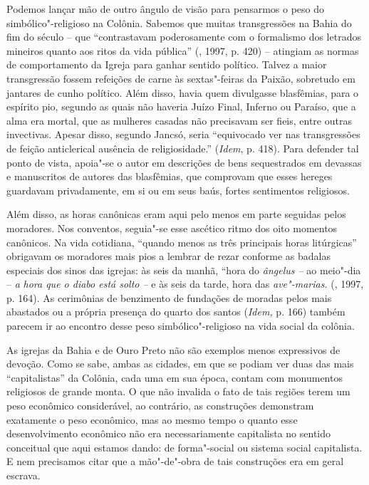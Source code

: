 Podemos lançar mão de outro ângulo de visão para pensarmos o peso do
simbólico"-religioso na Colônia. Sabemos que muitas transgressões na
Bahia do fim do século  -- que ``contrastavam poderosamente com o
formalismo dos letrados mineiros quanto aos ritos da vida pública''
(, 1997, p. 420) -- atingiam as normas de comportamento da Igreja
para ganhar sentido político. Talvez a maior transgressão fossem
refeições de carne às sextas"-feiras da Paixão, sobretudo em jantares de
cunho político. Além disso, havia quem divulgasse blasfêmias, para o
espírito pio, segundo as quais não haveria Juízo Final, Inferno ou
Paraíso, que a alma era mortal, que as mulheres casadas não precisavam
ser fieis, entre outras invectivas. Apesar disso, segundo Jancsó, seria
``equivocado ver nas transgressões de feição anticlerical ausência de
religiosidade.'' (\emph{Idem}, p. 418). Para defender tal ponto de
vista, apoia"-se o autor em descrições de bens sequestrados em devassas e
manuscritos de autores das blasfêmias, que comprovam que esses hereges
guardavam privadamente, em si ou em seus baús, fortes sentimentos
religiosos.

Além disso, as horas canônicas eram aqui pelo menos em parte seguidas
pelos moradores. Nos conventos, seguia"-se esse ascético ritmo dos oito
momentos canônicos. Na vida cotidiana, ``quando menos as três principais
horas litúrgicas'' obrigavam os moradores mais pios a lembrar de rezar
conforme as badalas especiais dos sinos das igrejas: às seis da manhã,
``hora do \emph{ângelus --} ao meio"-dia -- \emph{a} \emph{hora que o
diabo está solto --} e às seis da tarde, hora das \emph{ave"-marias.}
(, 1997, p. 164). As cerimônias de benzimento de fundações de
moradas pelos mais abastados ou a própria presença do quarto dos santos
(\emph{Idem,} p. 166) também parecem ir ao encontro desse peso
simbólico"-religioso na vida social da colônia.

As igrejas da Bahia e de Ouro Preto não são exemplos menos expressivos
de devoção. Como se sabe, ambas as cidades, em que se podiam ver duas
das mais ``capitalistas'' da Colônia, cada uma em sua época, contam com
monumentos religiosos de grande monta. O que não invalida o fato de tais
regiões terem um peso econômico considerável, ao contrário, as
construções demonstram exatamente o peso econômico, mas ao mesmo tempo o
quanto esse desenvolvimento econômico não era necessariamente
capitalista no sentido conceitual que aqui estamos dando: de
forma"-social ou sistema social capitalista. E nem precisamos citar que a
mão"-de"-obra de tais construções era em geral escrava.

